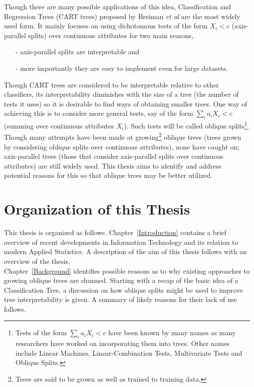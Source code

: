 Though there are many possible applications of this idea, Classification and Regression Trees (CART trees) proposed by Breiman \emph{et al} are the most widely used form. It mainly focuses on using dichotomous tests of the form $X_i<c$ (axis-parallel splits) over continuous attributes for two main reasons, 
\begin{itemize}
\item[-] axis-parallel splits are interpretable and 
\item[-] more importantly they are easy to implement even for large datasets.
\end{itemize}
Though CART trees are considered to be interpretable relative to other classifiers, its interpretability diminishes with the size of a tree (the number of tests it uses) so it is desirable to find ways of obtaining smaller trees. One way of achieving this is to consider more general tests, say of the form $\sum_i a_iX_i<c$ (summing over continuous attributes $X_i$). Such tests will be called oblique splits\footnote{Tests of the form $\sum_i a_iX_i<c$ have been known by many names as many researchers have worked on incorporating them into trees. Other names include Linear Machines, Linear-Combination Tests, Multivariate Tests and Oblique Splits.}.\\

Though many attempts have been made at growing\footnote{Trees are said to be grown as well as trained to training data.} oblique trees (trees grown by considering oblique splits over continuous attributes), none have caught on; axis-parallel trees (those that consider axis-parallel splits over continuous attributes) are still widely used. This thesis aims to identify and address potential reasons for this so that oblique trees may be better utilized.

\section{Organization of this Thesis}
\label{OrganizationofthisThesis}
This thesis is organized as follows. Chapter~\ref{Introduction} contains a brief overview of recent developments in Information Technology and its relation to modern Applied Statistics. A description of the aim of this thesis follows with an overview of the thesis. \\

Chapter~\ref{Background} identifies possible reasons as to why existing approaches to growing oblique trees are shunned. Starting with a recap of the basic idea of a Classification Tree, a discussion on how oblique splits might be used to improve tree interpretability is given. A summary of likely reasons for their lack of use follows. \\

